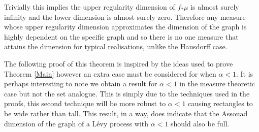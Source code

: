 Trivially this implies the upper regularity dimension of $f_*\mu$ is almost surely infinity and the lower dimension is almost surely zero. Therefore any measure whose upper regularity dimension approximates the dimension of the graph is highly dependent on the specific graph and so there is no one measure that attains the dimension for typical realisations, unlike the Hausdorff case. 

The following proof of this theorem is inspired by the ideas used to prove Theorem \ref{Main} however an extra case must be considered for when $\alpha < 1$. It is perhaps interesting to note we obtain a result for $\alpha < 1$ in the measure theoretic case but not the set analogue. This is simply due to the techniques used in the proofs, this second technique will be more robust to $\alpha < 1$ causing rectangles to be wide rather than tall. This result, in a way, does indicate that the Assouad dimension of the graph of a L\'evy process with $\alpha < 1$ should also be full.



